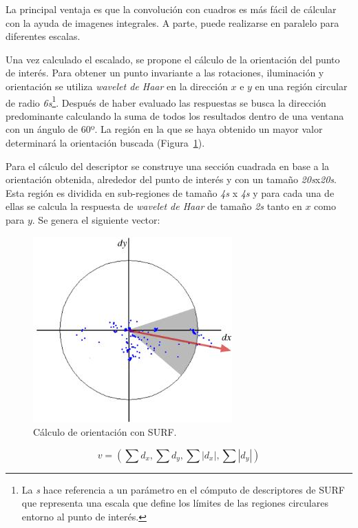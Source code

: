 La principal ventaja es que la convolución con cuadros es más fácil de cálcular con la ayuda de imagenes integrales. A parte, puede realizarse en paralelo para diferentes escalas.

Una vez calculado el escalado, se propone el cálculo de la orientación del punto de interés. Para obtener un punto invariante a las rotaciones, iluminación y orientación se utiliza \textit{wavelet de Haar} en la dirección $x$ e $y$ en una región circular de radio \textit{6s}\footnote{La \textit{s} hace referencia a un parámetro en el cómputo de descriptores de SURF que representa una escala que define los límites de las regiones circulares entorno al punto de interés.}. Después de haber evaluado las respuestas se busca la dirección predominante calculando la suma de todos los resultados dentro de una ventana con un ángulo de 60º. La región en la que se haya obtenido un mayor valor determinará la orientación buscada (Figura~\ref{fig:surf2}).

Para el cálculo del descriptor se construye una sección cuadrada en base a la orientación obtenida, alrededor del punto de interés y con un tamaño \textit{20s}x\textit{20s}. Esta región es dividida en sub-regiones de tamaño \textit{4s} x \textit{4s} y para cada una de ellas se calcula la respuesta de \textit{wavelet de Haar} de tamaño \textit{2s} tanto en $x$ como para $y$. Se genera el siguiente vector:

\begin{figure}[ht]
\centering
\includegraphics[scale=0.5]{Figures/surf-2.jpg}
\decoRule
\caption[Cálculo de orientación con SURF]{Cálculo de orientación con SURF.}
\label{fig:surf2}
\end{figure}

\begin{equation}
v=\left(\sum d_{x},\sum d_{y},\sum|d_{x}|,\sum|d_{y}|\right)
\end{equation}

